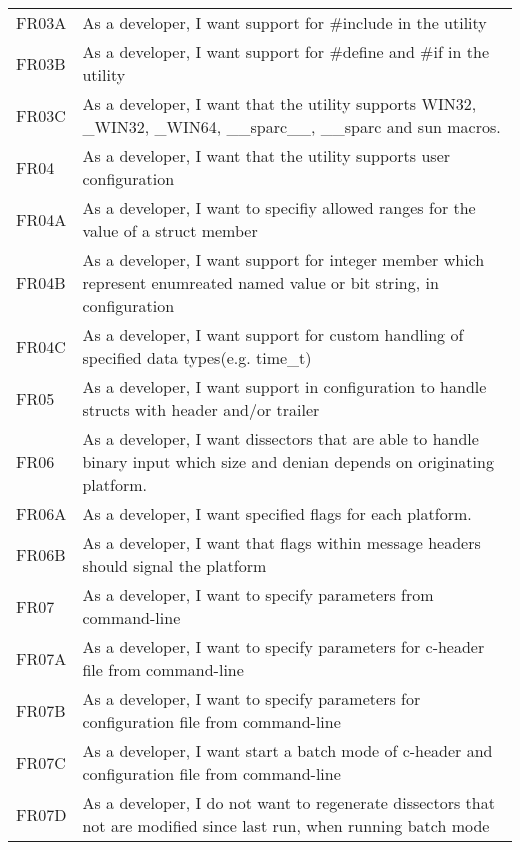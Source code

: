 \begin{table}[ht]
{\begin{tabularx}{1.2\textwidth}{l X}
	FR03A	& As a developer, I want support for \#include in the utility\\
	FR03B	& As a developer, I want support for \#define and \#if in the utility\\
	FR03C	& As a developer, I want that the utility supports WIN32, \_WIN32, \_WIN64, \_\_sparc\_\_, \_\_sparc and sun macros.\\
	\addlinespace
	FR04 	& As a developer, I want that the utility supports user configuration\\
	FR04A 	& As a developer, I want to specifiy allowed ranges for the value of a struct member\\
	FR04B	& As a developer, I want support for integer member which represent enumreated named value or bit string, in configuration\\
	FR04C	& As a developer, I want support for custom handling of specified data types(e.g. time\_t)\\
	\addlinespace
	FR05	& As a developer, I want support in configuration to handle structs with header and/or trailer\\
	\addlinespace
	FR06	& As a developer, I want dissectors that are able to handle binary input which size and denian depends on originating platform.\\
	FR06A	& As a developer, I want specified flags for each platform.\\
	FR06B	& As a developer, I want that flags within message headers should signal the platform\\
	\addlinespace
	FR07	& As a developer, I want to specify parameters from command-line\\
	FR07A	& As a developer, I want to specify parameters for c-header file from command-line\\
	FR07B	& As a developer, I want to specify parameters for configuration file from command-line\\
	FR07C	& As a developer, I want start a batch mode of c-header and configuration file from command-line\\
	FR07D	& As a developer, I do not want to regenerate dissectors that not are modified since last run, when running batch mode\\
	\bottomrule
\end{tabularx}}
\end{table}


